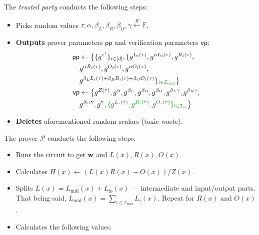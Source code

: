 \documentclass[../lecture-notes.tex]{subfiles}
\begin{document}
\begin{tcolorbox}
    The \emph{trusted party} conducts the following steps:
    \begin{itemize}[label=]
        \item Picks random values $\tau, \alpha, \beta_L, \beta_R, \beta_O, \gamma \xleftarrow{R} \mathbb{F}$.
        \item \textbf{Outputs} prover parameters $\mathsf{pp}$ and verification parameters $\mathsf{vp}$:
        \begin{equation*}
            \begin{aligned}
                \mathsf{pp} & \gets \big\{\{g^{\tau^i}\}_{i \in [d]}, \{g^{L_i(\tau)}, g^{\alpha L_i(\tau)}, g^{R_i(\tau)}, \\
                            & g^{\alpha R_i(\tau)}, g^{O_i(\tau)}, g^{\alpha O_i(\tau)}, \\
                            & g^{\beta_LL_i(\tau)+\beta_RR_i(\tau)+\beta_OO_i(\tau)}\}_{\textcolor{green!50!black}{i \in \mathcal{I}_{\text{mid}}}}\big\} \\
                \mathsf{vp} & \gets \big\{ g^{Z(\tau)}, g^{\alpha}, g^{\beta_L}, g^{\beta_R}, g^{\beta_O}, g^{\beta_L\gamma}, g^{\beta_R\gamma}, \\ 
                            & g^{\beta_O\gamma}, g^{\gamma}, \textcolor{green!50!black}{ \{g^{L_i(\tau)}, g^{R_i(\tau)}, g^{O_i(\tau)}\}_{i \in \mathcal{I}_{\text{io}}} } \big\}
            \end{aligned}
        \end{equation*}
        \item \textbf{Deletes} aforementioned random scalars (toxic waste).
    \end{itemize}
    The prover $\mathcal{P}$ conducts the following steps:
    \begin{itemize}[label=]
        \item Runs the circuit to get $\mathbf{w}$ and $L(x),R(x),O(x)$.
        \item Calculates $H(x) \gets (L(x)R(x) - O(x))\big/ Z(x)$.
        \item \textcolor{green!50!black}{Splits $L(x) = L_{\text{mid}}(x) + L_{\text{io}}(x)$ --- intermediate and input/output parts. That being said, $L_{\text{mid}}(x) = \sum_{i \in \mathcal{I}_{\text{mid}}}L_i(x)$. Repeat for $R(x)$ and $O(x)$.}
        \item Calculates the following values: 
        \begin{align*}

\end{align*}
\end{itemize}
\end{tcolorbox}
\end{document}
